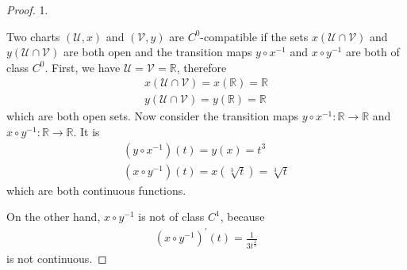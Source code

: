 \documentclass{book}
\theoremstyle{custom_definition}
\theoremstyle{custom_theorem}
\begin{document}
    \begin{proof}
        1.
        
        Two charts \((\mathcal{U}, x)\) and \((\mathcal{V}, y)\) are \(C^0\)-compatible if the sets \(x(\mathcal{U} \cap \mathcal{V})\) and \(y(\mathcal{U} \cap \mathcal{V})\) are both open and the transition maps \(y \circ x^{-1}\) and \(x \circ y^{-1}\) are both of class \(C^0\). First, we have \(\mathcal{U} = \mathcal{V} = \mathbb{R}\), therefore
        \begin{align}
            x(\mathcal{U} \cap \mathcal{V}) = x(\mathbb{R}) = \mathbb{R} \\
            y(\mathcal{U} \cap \mathcal{V}) = y(\mathbb{R}) = \mathbb{R}
        \end{align}
        which are both open sets. Now consider the transition maps \(y \circ x^{-1}: \mathbb{R} \longrightarrow \mathbb{R}\) and \(x \circ y^{-1}: \mathbb{R} \longrightarrow \mathbb{R}\). It is
        \begin{align}
            \left( y \circ x^{-1} \right) (t) = y(x) = t^3 \\
            \left( x \circ y^{-1} \right) (t) = x(\sqrt[3]{t}) = \sqrt[3]{t}
        \end{align}
        which are both continuous functions.

        On the other hand, \(x \circ y^{-1}\) is not of class \(C^1\), because
        \begin{align}
            (x \circ y^{-1})^\prime (t) = \frac{1}{3t^{\frac{2}{3}}}
        \end{align}
        is not continuous.
    \end{proof}
\end{document}
